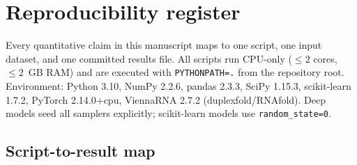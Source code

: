 \section{Reproducibility register}
Every quantitative claim in this manuscript maps to one script, one input
dataset, and one committed results file. All scripts run CPU-only
(${\leq}2$ cores, ${\leq}2$~GB RAM) and are executed with
\texttt{PYTHONPATH=.} from the repository root. Environment: Python 3.10,
NumPy 2.2.6, pandas 2.3.3, SciPy 1.15.3, scikit-learn 1.7.2, PyTorch
2.14.0+cpu, ViennaRNA 2.7.2 (duplexfold/RNAfold). Deep models seed all
samplers explicitly; scikit-learn models use \texttt{random\_state=0}.

\subsection{Script-to-result map}
